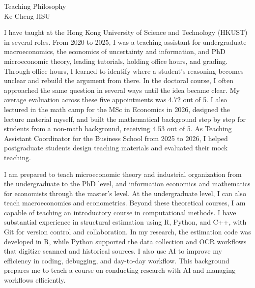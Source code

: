 \documentclass[11pt]{article}
\begin{document}
\begin{center}
{\Large Teaching Philosophy}\\[0.3em]
Ke Cheng HSU
\end{center}

I have taught at the Hong Kong University of Science and Technology (HKUST) in several roles. From 2020 to 2025, I was a teaching assistant for undergraduate macroeconomics, the economics of uncertainty and information, and PhD microeconomic theory, leading tutorials, holding office hours, and grading. Through office hours, I learned to identify where a student's reasoning becomes unclear and rebuild the argument from there. In the doctoral course, I often approached the same question in several ways until the idea became clear. My average evaluation across these five appointments was 4.72 out of 5. I also lectured in the math camp for the MSc in Economics in 2026, designed the lecture material myself, and built the mathematical background step by step for students from a non-math background, receiving 4.53 out of 5. As Teaching Assistant Coordinator for the Business School from 2025 to 2026, I helped postgraduate students design teaching materials and evaluated their mock teaching.

I am prepared to teach microeconomic theory and industrial organization from the undergraduate to the PhD level, and information economics and mathematics for economists through the master's level. At the undergraduate level, I can also teach macroeconomics and econometrics. Beyond these theoretical courses, I am capable of teaching an introductory course in computational methods. I have substantial experience in structural estimation using R, Python, and C++, with Git for version control and collaboration. In my research, the estimation code was developed in R, while Python supported the data collection and OCR workflows that digitize scanned and historical sources. I also use AI to improve my efficiency in coding, debugging, and day-to-day workflow. This background prepares me to teach a course on conducting research with AI and managing workflows efficiently.
\end{document}

